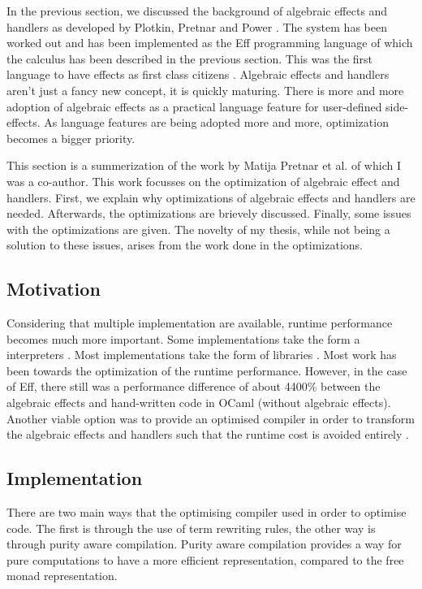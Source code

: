In the previous section, we discussed the background of algebraic effects and handlers as developed by Plotkin, Pretnar and Power \cite{DBLP:journals/acs/PlotkinP03, DBLP:conf/lics/PlotkinP08}. The system has been worked out and has been implemented as the Eff programming language of which the calculus has been described in the previous section. This was the first language to have effects as first class citizens \cite{pretnar2015introduction}. Algebraic effects and handlers aren't just a fancy new concept, it is quickly maturing. There is more and more adoption of algebraic effects as a practical language feature for user-defined side-effects. As language features are being adopted more and more, optimization becomes a bigger priority.

This section is a summerization of the work by Matija Pretnar et al. of which I was a co-author. This work focusses on the optimization of algebraic effect and handlers. First, we explain why optimizations of algebraic effects and handlers are needed. Afterwards, the optimizations are brievely discussed. Finally, some issues with the optimizations are given. The novelty of my thesis, while not being a solution to these issues, arises from the work done in the optimizations.

\subsection{Motivation}

Considering that multiple implementation are available, runtime performance becomes much more important. Some implementations take the form a interpreters \cite{programming, links2ocaml}. Most implementations take the form of libraries \cite{DBLP:conf/icfp/Brady13, kammar, eff2ocaml}. Most work has been towards the optimization of the runtime performance. However, in the case of Eff, there still was a performance difference of about 4400\% between the algebraic effects and hand-written code in OCaml (without algebraic effects). Another viable option was to provide an optimised compiler in order to transform the algebraic effects and handlers such that the runtime cost is avoided entirely \cite{optimization}. 

\subsection{Implementation}
There are two main ways that the optimising compiler used in order to optimise \eff code. The first is through the use of term rewriting rules, the other way is through purity aware compilation. Purity aware compilation provides a way for pure computations to have a more efficient representation, compared to the free monad representation. 

